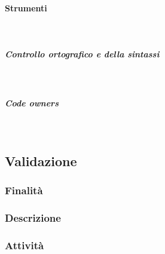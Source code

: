 \documentclass[../norme-di-progetto.tex]{subfiles}
\begin{document}
\paragraph{Strumenti}\mbox{}\\
\subparagraph{Controllo ortografico e della sintassi}\mbox{}\\
\subparagraph{Code owners}\mbox{}\\
\subsection{Validazione}
\subsubsection{Finalità}
\subsubsection{Descrizione}
\subsubsection{Attività}
\end{document}
